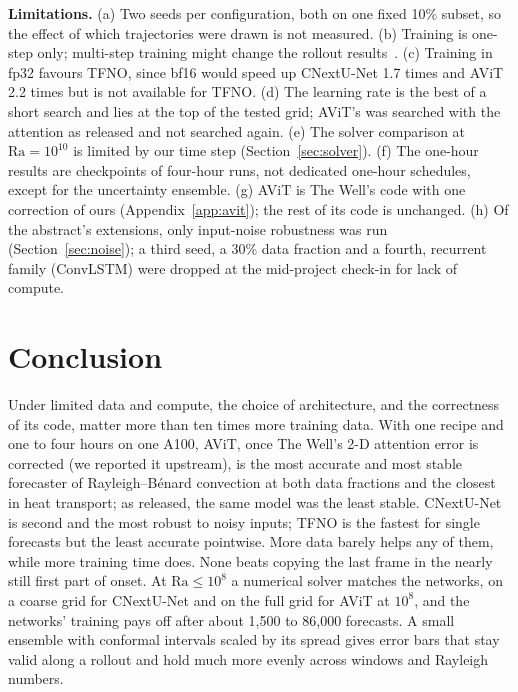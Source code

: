 \documentclass[11pt]{article}
\begin{document}
\textbf{Limitations.} (a) Two seeds per configuration, both on one fixed 10\% subset, so the effect of which
trajectories were drawn is not measured. (b) Training is one-step only; multi-step training might change the rollout
results~\cite{brandstetter2022mp}. (c) Training in fp32 favours TFNO, since bf16 would speed up CNextU-Net 1.7 times
and AViT 2.2 times but is not available for TFNO. (d) The learning rate is the best of a short search and lies at the
top of the tested grid; AViT's was searched with the attention as released and not searched again. (e) The solver
comparison at $\mathrm{Ra}=10^{10}$ is limited by our time step (Section~\ref{sec:solver}). (f) The one-hour results
are checkpoints of four-hour runs, not dedicated one-hour schedules, except for the uncertainty ensemble. (g) AViT is
The Well's code with one correction of ours (Appendix~\ref{app:avit}); the rest of its code is unchanged.
(h) Of the abstract's extensions, only input-noise robustness was run (Section~\ref{sec:noise}); a third seed, a
30\% data fraction and a fourth, recurrent family (ConvLSTM) were dropped at the mid-project check-in for lack of
compute.

\section{Conclusion}
\label{sec:conclusion}

Under limited data and compute, the choice of architecture, and the correctness of its code, matter more than ten
times more training data. With one recipe and one to four hours on one A100, AViT, once The Well's 2-D attention
error is corrected (we reported it upstream), is the most accurate and most stable forecaster of
Rayleigh--B\'enard convection at both data fractions and the closest in heat transport; as released, the same model
was the least stable. CNextU-Net is second and the most robust to noisy inputs; TFNO is the fastest for single
forecasts but the least accurate pointwise. More data barely helps any of them, while more training time does. None
beats copying the last frame in the nearly still first part of onset. At $\mathrm{Ra}\le10^8$ a numerical solver
matches the networks, on a coarse grid for CNextU-Net and on the full grid for AViT at $10^8$, and the networks'
training pays off after about 1,500 to 86,000 forecasts. A small ensemble with conformal intervals scaled by its
spread gives error bars that stay valid along a rollout and hold much more evenly across windows and Rayleigh
numbers.
\end{document}
